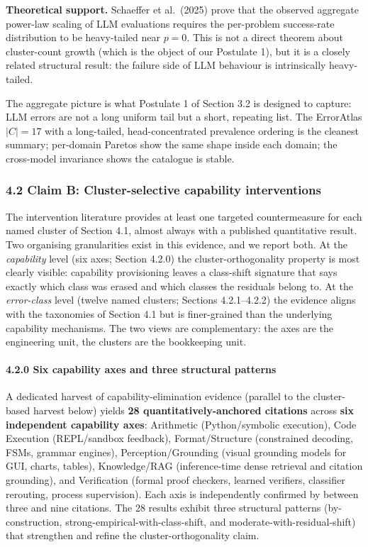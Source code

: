 \documentclass[
]{article}
\begin{document}
\textbf{Theoretical support.} Schaeffer et al.~(2025) prove that the
observed aggregate power-law scaling of LLM evaluations requires the
per-problem success-rate distribution to be heavy-tailed near \(p = 0\).
This is not a direct theorem about cluster-count growth (which is the
object of our Postulate 1), but it is a closely related structural
result: the failure side of LLM behaviour is intrinsically heavy-tailed.

The aggregate picture is what Postulate 1 of Section 3.2 is designed to
capture: LLM errors are not a long uniform tail but a short, repeating
list. The ErrorAtlas \(|C| = 17\) with a long-tailed, head-concentrated
prevalence ordering is the cleanest summary; per-domain Paretos show the
same shape inside each domain; the cross-model invariance shows the
catalogue is stable.

\subsubsection{4.2 Claim B: Cluster-selective capability
interventions}\label{claim-b-cluster-selective-capability-interventions}

The intervention literature provides at least one targeted
countermeasure for each named cluster of Section 4.1, almost always with
a published quantitative result. Two organising granularities exist in
this evidence, and we report both. At the \emph{capability} level (six
axes; Section 4.2.0) the cluster-orthogonality property is most clearly
visible: capability provisioning leaves a class-shift signature that
says exactly which class was erased and which classes the residuals
belong to. At the \emph{error-class} level (twelve named clusters;
Sections 4.2.1--4.2.2) the evidence aligns with the taxonomies of
Section 4.1 but is finer-grained than the underlying capability
mechanisms. The two views are complementary: the axes are the
engineering unit, the clusters are the bookkeeping unit.

\paragraph{4.2.0 Six capability axes and three structural
patterns}\label{six-capability-axes-and-three-structural-patterns}

A dedicated harvest of capability-elimination evidence (parallel to the
cluster-based harvest below) yields \textbf{28 quantitatively-anchored
citations} across \textbf{six independent capability axes}: Arithmetic
(Python/symbolic execution), Code Execution (REPL/sandbox feedback),
Format/Structure (constrained decoding, FSMs, grammar engines),
Perception/Grounding (visual grounding models for GUI, charts, tables),
Knowledge/RAG (inference-time dense retrieval and citation grounding),
and Verification (formal proof checkers, learned verifiers, classifier
rerouting, process supervision). Each axis is independently confirmed by
between three and nine citations. The 28 results exhibit three
structural patterns (by-construction, strong-empirical-with-class-shift,
and moderate-with-residual-shift) that strengthen and refine the
cluster-orthogonality claim.
\end{document}
